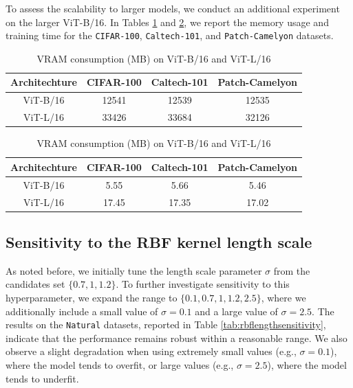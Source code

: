 To assess the scalability to larger models, we conduct an additional experiment on the larger ViT-B/16. In Tables \ref{tab:vram} and \ref{tab:trainingtime}, we report the memory usage and training time for the \texttt{CIFAR-100}, \texttt{Caltech-101}, and \texttt{Patch-Camelyon} datasets.


\begin{table}[h]
\centering
\caption{VRAM consumption (MB) on ViT-B/16 and ViT-L/16}
\label{tab:vram}
\begin{tabular}{c|ccc}
\hline
Architechture & CIFAR-100 & Caltech-101 & Patch-Camelyon \\ \hline
ViT-B/16               & 12541              & 12539                & 12535                   \\
ViT-L/16               & 33426              & 33684                & 32126                   \\ \hline
\end{tabular}
\end{table}

\begin{table}[h]
\centering
\caption{VRAM consumption (MB) on ViT-B/16 and ViT-L/16}
\label{tab:trainingtime}
\begin{tabular}{c|ccc}
\hline
Architechture & CIFAR-100 & Caltech-101 & Patch-Camelyon \\ \hline
ViT-B/16               & 5.55              & 5.66                & 5.46                   \\
ViT-L/16               & 17.45              & 17.35                & 17.02                   \\ \hline
\end{tabular}
\end{table}

\subsection{Sensitivity to the RBF kernel length scale}
As noted before, we initially tune the length scale parameter $\sigma$ from the candidates set $\{0.7, 1, 1.2\}$. To further investigate sensitivity to this hyperparameter, we expand the range to $\{0.1, 0.7, 1, 1.2, 2.5\}$, where we additionally include a small value of $\sigma = 0.1$ and a large value of $\sigma = 2.5$. The results on the \texttt{Natural} datasets, reported in Table \ref{tab:rbflengthsensitivity}, indicate that the performance remains robust within a reasonable range. We also observe a slight degradation when using extremely small values (e.g., $\sigma = 0.1$), where the model tends to overfit, or large values (e.g., $\sigma = 2.5$), where the model tends to underfit.

